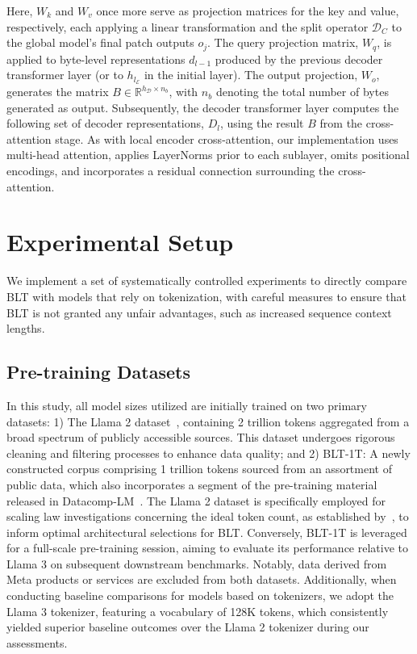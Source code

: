 Here, $W_k$ and $W_v$ once more serve as projection matrices for the key and value, respectively, each applying a linear transformation and the split operator $\mathcal{D}_C$ to the global model’s final patch outputs $o_j$. The query projection matrix, $W_q$, is applied to byte-level representations $d_{l-1}$ produced by the previous decoder transformer layer (or to $h_{l_{\mathcal{E}}}$ in the initial layer). The output projection, $W_o$, generates the matrix $B \in \mathbb{R}^{h_{\mathcal{D}} \times n_b}$, with $n_b$ denoting the total number of bytes generated as output. Subsequently, the decoder transformer layer computes the following set of decoder representations, $D_l$, using the result $B$ from the cross-attention stage. As with local encoder cross-attention, our implementation uses multi-head attention, applies LayerNorms prior to each sublayer, omits positional encodings, and incorporates a residual connection surrounding the cross-attention.

\section{Experimental Setup}
\label{section:experiments}
We implement a set of systematically controlled experiments to directly compare {\textsc BLT} with models that rely on tokenization, with careful measures to ensure that {\textsc BLT} is not granted any unfair advantages, such as increased sequence context lengths.

\subsection{Pre-training Datasets} In this study, all model sizes utilized are initially trained on two primary datasets: 1) The Llama 2 dataset~\citep{touvron2023llama}, containing 2 trillion tokens aggregated from a broad spectrum of publicly accessible sources. This dataset undergoes rigorous cleaning and filtering processes to enhance data quality; and 2) {\textsc BLT}-1T: A newly constructed corpus comprising 1 trillion tokens sourced from an assortment of public data, which also incorporates a segment of the pre-training material released in Datacomp-LM~\citep{li2024datacomp}. The Llama 2 dataset is specifically employed for scaling law investigations concerning the ideal token count, as established by~\cite{dubey2024llama}, to inform optimal architectural selections for {\textsc BLT}. Conversely, {\textsc BLT}-1T is leveraged for a full-scale pre-training session, aiming to evaluate its performance relative to Llama 3 on subsequent downstream benchmarks. Notably, data derived from Meta products or services are excluded from both datasets. Additionally, when conducting baseline comparisons for models based on tokenizers, we adopt the Llama 3 tokenizer, featuring a vocabulary of 128K tokens, which consistently yielded superior baseline outcomes over the Llama 2 tokenizer during our assessments.

